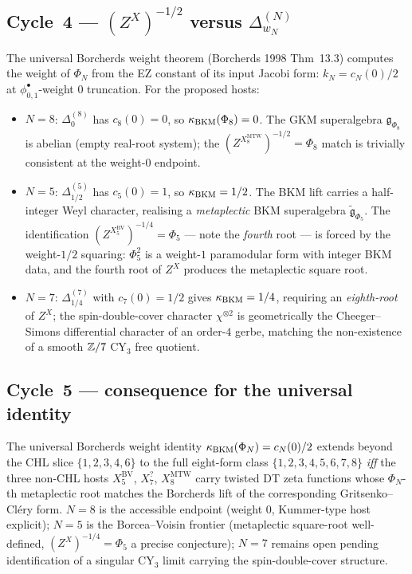 \subsection*{Cycle~4 --- $(Z^{X})^{-1/2}$ versus $\Delta_{w_N}^{(N)}$}

The universal Borcherds weight theorem (Borcherds 1998 Thm~13.3)
computes the weight of $\Phi_{N}$ from the EZ constant of its input
Jacobi form: $k_N=c_N(0)/2$ at $\phi_{0,1}^{\bullet}$-weight $0$
truncation. For the proposed hosts:
\begin{itemize}[leftmargin=1.8em,itemsep=0.3ex]
\item $N=8$: $\Delta_{0}^{(8)}$ has $c_8(0)=0$, so $\kappa_{\mathrm{BKM}}(\Phi_8)=0$.
  The GKM superalgebra $\mathfrak{g}_{\Phi_{8}}$ is abelian (empty
  real-root system); the $(Z^{X_{8}^{\mathrm{MTW}}})^{-1/2}=\Phi_{8}$
  match is trivially consistent at the weight-$0$ endpoint.
\item $N=5$: $\Delta_{1/2}^{(5)}$ has $c_5(0)=1$, so $\kappa_{\mathrm{BKM}}=1/2$.
  The BKM lift carries a half-integer Weyl character, realising a
  \emph{metaplectic} BKM superalgebra $\widetilde{\mathfrak{g}}_{\Phi_{5}}$.
  The identification $(Z^{X_{5}^{\mathrm{BV}}})^{-1/4}=\Phi_{5}$
  --- note the \emph{fourth} root --- is forced by the weight-$1/2$
  squaring: $\Phi_5^2$ is a weight-$1$ paramodular form with
  integer BKM data, and the fourth root of $Z^{X}$ produces the
  metaplectic square root.
\item $N=7$: $\Delta_{1/4}^{(7)}$ with $c_7(0)=1/2$ gives $\kappa_{\mathrm{BKM}}=1/4$,
  requiring an \emph{eighth-root} of $Z^{X}$; the spin-double-cover
  character $\chi^{\otimes 2}$ is geometrically the Cheeger--Simons
  differential character of an order-$4$ gerbe, matching the
  non-existence of a smooth $\mathbb{Z}/7$ CY$_3$ free quotient.
\end{itemize}

\subsection*{Cycle~5 --- consequence for the universal identity}

The universal Borcherds weight identity
$\kappa_{\mathrm{BKM}}(\Phi_N)=c_N(0)/2$ extends beyond the CHL slice $\{1,2,3,4,6\}$
to the full eight-form class $\{1,2,3,4,5,6,7,8\}$ \emph{iff} the
three non-CHL hosts $X_{5}^{\mathrm{BV}}$, $X_{7}^{\mathrm{?}}$,
$X_{8}^{\mathrm{MTW}}$ carry twisted DT zeta functions whose
$\Phi_N$-th metaplectic root matches the Borcherds lift of the
corresponding Gritsenko--Cl\'ery form. $N=8$ is the accessible
endpoint (weight $0$, Kummer-type host explicit); $N=5$ is the
Borcea--Voisin frontier (metaplectic square-root well-defined,
$(Z^X)^{-1/4}=\Phi_5$ a precise conjecture); $N=7$ remains open
pending identification of a singular CY$_3$ limit carrying the
spin-double-cover structure.

